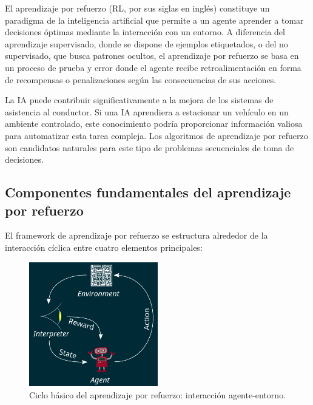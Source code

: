 
El aprendizaje por refuerzo (RL, por sus siglas en inglés) constituye un paradigma de la inteligencia artificial
que permite a un agente aprender a tomar decisiones óptimas mediante la interacción con un entorno.
A diferencia del aprendizaje supervisado, donde se dispone de ejemplos etiquetados, o del no supervisado,
que busca patrones ocultos, el aprendizaje por refuerzo se basa en un proceso de prueba y error donde el agente
recibe retroalimentación en forma de recompensas o penalizaciones según las consecuencias de sus acciones.


La IA puede contribuir significativamente a la mejora de los sistemas de asistencia al conductor.
Si una IA aprendiera a estacionar un vehículo en un ambiente controlado, este conocimiento podría
proporcionar información valiosa para automatizar esta tarea compleja. Los algoritmos de aprendizaje
por refuerzo son candidatos naturales para este tipo de problemas secuenciales de toma de decisiones.

\subsection{Componentes fundamentales del aprendizaje por refuerzo}\label{subsec:rl-components}

El framework de aprendizaje por refuerzo se estructura alrededor de la interacción cíclica entre
cuatro elementos principales:

\begin{figure}[!ht]
    \centering
    \includegraphics[width=0.5\textwidth]{img/2-mt/RL.png}
    \caption{Ciclo básico del aprendizaje por refuerzo: interacción agente-entorno.}
    \label{fig:rl-cycle}
\end{figure}

